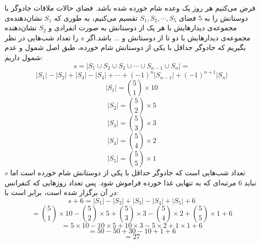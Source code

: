 \p
فرض می‌کنیم هر روز یک وعده شام خورده شده باشد. فضای حالات ملاقات جادوگر با دوستانش را به 
$5$
فضای
$S_1, S_2, \cdots, S_5$
تقسیم می‌کنیم، به طوری که 
$S_1$
نشان‌دهنده‌ی مجموعه‌ی دیدارهایش با هر یک از دوستانش به صورت انفرادی و
$S_2$
نشان‌دهنده مجموعه‌ی دیدارهایش با دو تا از دوستانش و
...
باشد.اگر
$s$
را تعداد شب‌هایی در نظر بگیریم که جادوگر حداقل با یکی از دوستانش شام خورده،
طبق اصل شمول و عدم شمول داریم:
$$s = |S_1 \cup S_2 \cup S_3 \cup \cdots \cup S_{n-1} \cup S_n| =$$
$$|S_1| - |S_2| + |S_3| - |S_4| + \cdots + (-1)^n|S_{n-1}| + (-1)^{n+1}|S_n| $$
$$|S_1| = \binom{5}{1} \times 10$$
$$|S_2| = \binom{5}{2} \times 5$$
$$|S_3| = \binom{5}{3} \times 3$$
$$|S_4| = \binom{5}{4} \times 2$$
$$|S_5| = \binom{5}{5} \times 1$$
\p
$s$
تعداد شب‌هایی است که جادوگر حداقل با یکی از دوستانش شام خورده است اما نباید
$6$
مرتبه‌ای که به تنهایی غذا خورده فراموش شود. پس تعداد روزهایی که کنفرانس در آن برگزار شده است، برابر است با:
$$s + 6 = |S_1| - |S_2| + |S_3| - |S_4| + |S_5| + 6$$
$$= \binom{5}{1} \times 10 - \binom{5}{2} \times 5 + \binom{5}{3} \times 3 - \binom{5}{4} \times 2 + \binom{5}{5} \times 1 + 6$$
$$= 5 \times 10 - 10 \times 5 + 10 \times 3 - 5 \times 2 + 1 \times 1 + 6$$
$$= 50 - 50 + 30 -10 + 1 + 6$$
$$= 27$$
